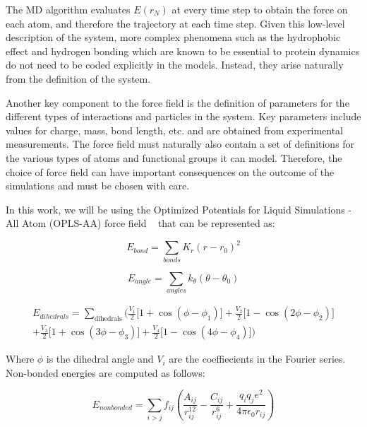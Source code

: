 The MD algorithm evaluates $E(r_{N})$ at every time step to obtain the force on each atom, and therefore the trajectory at each time step. Given this low-level description of the system, more complex phenomena such as the hydrophobic effect and hydrogen bonding which are known to be essential to protein dynamics do not need to be coded explicitly in the models. Instead, they arise naturally from the definition of the system.

Another key component to the force field is the definition of parameters for the different types of interactions and particles in the system. Key parameters include values for charge, mass, bond length, etc. and are obtained from experimental measurements. The force field must naturally also contain a set of definitions for the various types of atoms and functional groups it can model. Therefore, the choice of force field can have important consequences on the outcome of the simulations and must be chosen with care.

In this work, we will be using the Optimized Potentials for Liquid Simulations - All Atom (OPLS-AA) force field ~\cite{jorgensen1988opls} that can be represented as:


\begin{equation}
E_{bond} = \sum_{bonds} K_{r} (r - r_{0})^2	
\end{equation}

\begin{equation}
 E_{angle} = \sum_{angles} k_{\theta} (\theta - \theta_0) 
\end{equation}

\begin{multline}
E_{dihedrals} = \sum_\mathrm{dihedrals} \Big( \frac {V_1} {2} \big[ 1 + \cos (\phi-\phi_1) \big] 
                + \frac {V_2} {2} \big[ 1 - \cos (2\phi-\phi_2) \big] \\
                + \frac {V_3} {2} \big[ 1 + \cos (3\phi-\phi_3) \big] 
                + \frac {V_4} {2} \big[ 1 - \cos (4\phi-\phi_4) \big] \Big)
\end{multline}

Where $\phi$ is the dihedral angle and $V_{i}$ are the coeffiecients in the Fourier series. Non-bonded energies are computed as follows:

\begin{equation}
E_{nonbonded} = \sum_{i>j} f_{ij} \left(
                    \frac {A_{ij}}{r_{ij}^{12}} - \frac {C_{ij}}{r_{ij}^6}
                    + \frac {q_iq_j e^2}{4\pi\epsilon_0 r_{ij}} \right)
\end{equation}

